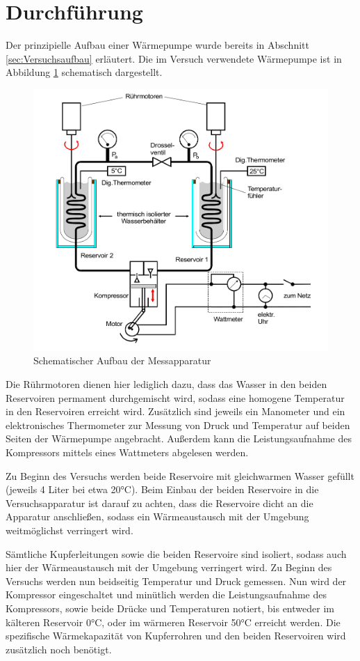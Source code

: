 \section{Durchführung}
\label{sec:Durchführung}
Der prinzipielle Aufbau einer Wärmepumpe wurde bereits in Abschnitt \ref{sec:Versuchsaufbau} erläutert. Die im Versuch verwendete Wärmepumpe ist in Abbildung \ref{fig:bild2} schematisch dargestellt.
\begin{figure}
  \centering
  \includegraphics[width=\textwidth]{content/messapparatur.png}
  \caption{Schematischer Aufbau der Messapparatur \cite{Anleitung}}
  \label{fig:bild2}
\end{figure}

Die Rührmotoren dienen hier lediglich dazu, dass das Wasser in den beiden Reservoiren permament durchgemischt wird, sodass eine homogene Temperatur in den Reservoiren erreicht wird.
Zusätzlich sind jeweils ein Manometer und ein elektronisches Thermometer zur Messung von Druck und Temperatur auf beiden Seiten der Wärmepumpe angebracht.
Außerdem kann die Leistungsaufnahme des Kompressors mittels eines Wattmeters abgelesen werden.

Zu Beginn des Versuchs werden beide Reservoire mit gleichwarmen Wasser gefüllt (jeweils 4 Liter bei etwa 20°C).
Beim Einbau der beiden Reservoire in die Versuchsapparatur ist darauf zu achten, dass die Reservoire dicht an die Apparatur anschließen, sodass ein Wärmeaustausch mit der Umgebung weitmöglichst verringert wird.

Sämtliche Kupferleitungen sowie die beiden Reservoire sind isoliert, sodass auch hier der Wärmeaustausch mit der Umgebung verringert wird.
Zu Beginn des Versuchs werden nun beidseitig Temperatur und Druck gemessen. Nun wird der Kompressor eingeschaltet und minütlich werden die Leistungsaufnahme des Kompressors, sowie beide Drücke und Temperaturen notiert, bis entweder im kälteren Reservoir 0°C, oder im wärmeren Reservoir 50°C erreicht werden.
Die spezifische Wärmekapazität von Kupferrohren und den beiden Reservoiren wird zusätzlich noch benötigt.
